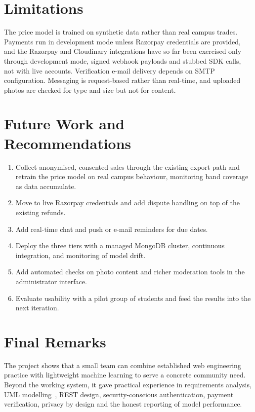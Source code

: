 \documentclass[11pt,letterpaper,oneside]{report}
\begin{document}
\section{Limitations}
The price model is trained on synthetic data rather than real campus trades. Payments run in development
mode unless Razorpay credentials are provided, and the Razorpay and Cloudinary integrations have so far
been exercised only through development mode, signed webhook payloads and stubbed SDK calls, not
with live accounts. Verification e-mail delivery
depends on SMTP configuration. Messaging is request-based rather than real-time, and uploaded photos are
checked for type and size but not for content.

\section{Future Work and Recommendations}
\begin{enumerate}
  \item Collect anonymised, consented sales through the existing export path and retrain the price model
        on real campus behaviour, monitoring band coverage as data accumulate.
  \item Move to live Razorpay credentials and add dispute handling on top of the existing refunds.
  \item Add real-time chat and push or e-mail reminders for due dates.
  \item Deploy the three tiers with a managed MongoDB cluster, continuous integration, and monitoring of
        model drift.
  \item Add automated checks on photo content and richer moderation tools in the administrator interface.
  \item Evaluate usability with a pilot group of students and feed the results into the next iteration.
\end{enumerate}

\section{Final Remarks}
The project shows that a small team can combine established web engineering practice with lightweight
machine learning to serve a concrete community need. Beyond the working system, it gave practical
experience in requirements analysis, UML modelling~\cite{uml,sommerville}, REST design, security-conscious
authentication, payment verification, privacy by design and the honest reporting of model performance.
\end{document}
